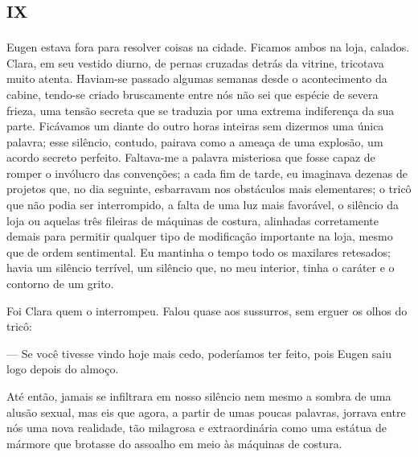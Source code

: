 

\chapter*{\huge\centering\textsc{ix}}

Eugen estava fora para resolver coisas na cidade. Ficamos ambos na loja, calados. Clara, em seu vestido diurno, de pernas cruzadas detrás da vitrine, tricotava muito atenta. Haviam-se passado algumas semanas desde o acontecimento da cabine, tendo-se criado bruscamente entre nós não sei que espécie de severa frieza, uma tensão secreta que se traduzia por uma extrema indiferença da sua parte. Ficávamos um diante do outro horas inteiras sem dizermos uma única palavra; esse silêncio, contudo, pairava como a ameaça de uma explosão, um acordo secreto perfeito. Faltava-me a palavra misteriosa que fosse capaz de romper o invólucro das convenções; a cada fim de tarde, eu imaginava dezenas de projetos que, no dia seguinte, esbarravam nos obstáculos mais elementares; o tricô que não podia ser interrompido, a falta de uma luz mais favorável, o silêncio da loja ou aquelas três fileiras de máquinas de costura, alinhadas corretamente demais para permitir qualquer tipo de modificação importante na loja, mesmo que de ordem sentimental. Eu mantinha o tempo todo os maxilares retesados; havia um silêncio terrível, um silêncio que, no meu interior, tinha o caráter e o contorno de um grito.

Foi Clara quem o interrompeu. Falou quase aos sussurros, sem erguer os olhos do tricô:

--- Se você tivesse vindo hoje mais cedo, poderíamos ter feito, pois Eugen saiu logo depois do almoço.

Até então, jamais se infiltrara em nosso silêncio nem mesmo a sombra de uma alusão sexual, mas eis que agora, a partir de umas poucas palavras, jorrava entre nós uma nova realidade, tão milagrosa e extraordinária como uma estátua de mármore que brotasse do assoalho em meio às máquinas de costura.

